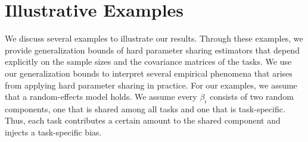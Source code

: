 \section{Illustrative Examples}\label{sec_example}


We discuss several examples to illustrate our results.
Through these examples, we provide generalization bounds of hard parameter sharing estimators that depend explicitly on the sample sizes and the covariance matrices of the tasks.
We use our generalization bounds to interpret several empirical phenomena that arises from applying hard parameter sharing in practice.
For our examples, we assume that a random-effects model holds.
We assume every $\beta_i$ consists of two random components, one that is shared among all tasks and one that is task-specific.
Thus, each task contributes a certain amount to the shared component and injects a task-specific bias.

